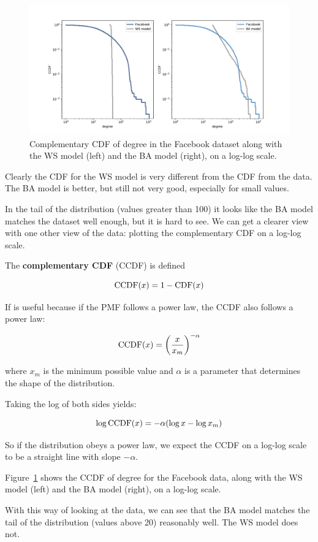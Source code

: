 \documentclass[12pt]{book}
\theoremstyle{exercise}
\begin{document}
\begin{figure}
\centerline{\includegraphics[width=5.5in]{figs/chap04-5.pdf}}
\caption{Complementary CDF of degree in the Facebook dataset along with the WS model (left) and the BA model (right), on a log-log scale.}
\label{chap04-5}
\end{figure}

Clearly the CDF for the WS model is very different from the CDF
from the data.  The BA model is better, but still not very good,
especially for small values.

In the tail of the distribution (values greater than 100) it looks
like the BA model matches the dataset well enough, but it is
hard to see.  We can get a clearer view with one other view of the
data: plotting the complementary CDF on a log-log scale.

The {\bf complementary CDF} (CCDF) is defined

\[ \mathrm{CCDF}(x) = 1 - \mathrm{CDF}(x) \]

If is useful because if the PMF follows a power law, the CCDF 
also follows a power law:

\[ \mathrm{CCDF}(x) = \left( \frac{x}{x_m} \right)^{-\alpha} \]

where $x_m$ is the minimum possible value and $\alpha$ is a parameter
that determines the shape of the distribution.

Taking the log of both sides yields:

\[ \log \mathrm{CCDF}(x) = -\alpha (\log x - \log x_m) \]

So if the distribution obeys a power law, we expect the CCDF on
a log-log scale to be a straight line with slope $-\alpha$.

Figure~\ref{chap04-5} shows the CCDF of degree for the Facebook data,
along with the WS model (left) and the BA model (right), on a log-log
scale.

With this way of looking at the data, we can see that the BA model
matches the tail of the distribution (values above 20) reasonably well.
The WS model does not.
\end{document}
